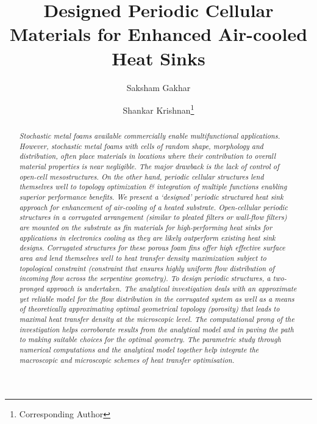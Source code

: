 \documentclass[twocolumn,10pt,cleanfoot]{ihmtc}
\title{Designed Periodic Cellular Materials for Enhanced Air-cooled Heat Sinks}
\author{Saksham Gakhar
\affiliation{Student, Indian Institute of Technology Bombay\\saksham.gakhar94@gmail.com}
   
    }
\author{Shankar Krishnan\thanks{Corresponding Author}
\affiliation{Professor, Indian Institute of Technology Bombay\\kshankar@iitb.ac.in}
   
    }
\begin{document}
\maketitle 

\begin{abstract}
{\it \small
Stochastic metal foams available commercially enable multifunctional applications. However, stochastic metal foams with cells of random shape, morphology and distribution, often place materials in locations where their contribution to overall material properties is near negligible. The major drawback is the lack of control of open-cell mesostructures. On the other hand, periodic cellular structures lend themselves well to topology optimization \& integration of multiple functions enabling superior performance benefits. We present a `designed' periodic structured heat sink approach for enhancement of air-cooling of a heated substrate. Open-cellular periodic structures in a corrugated arrangement (similar to pleated filters or wall-flow filters) are mounted on the substrate as fin materials for high-performing heat sinks for applications in electronics cooling as they are likely outperform existing heat sink designs. Corrugated structures for these porous foam fins offer high effective surface area and lend themselves well to heat transfer density maximization subject to topological constraint (constraint that ensures highly uniform flow distribution of incoming flow across the serpentine geometry). To design periodic structures, a two-pronged approach is undertaken. The analytical investigation deals with an approximate yet reliable model for the flow distribution in the corrugated system as well as a means of theoretically approximating optimal geometrical topology (porosity) that leads to maximal heat transfer density at the microscopic level. The computational prong of the investigation helps corroborate results from the analytical model and in paving the path to making suitable choices for the optimal geometry. The parametric study through numerical computations and the analytical model together help integrate the macroscopic and microscopic schemes of heat transfer optimisation.
}
\end{abstract}
\end{document}
